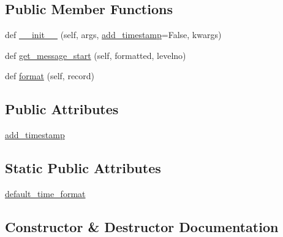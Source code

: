 \subsection*{Public Member Functions}
\begin{DoxyCompactItemize}
\item 
def \hyperlink{classpip_1_1__internal_1_1utils_1_1logging_1_1IndentingFormatter_a319d437a93091b5149193f7ed273616a}{\+\_\+\+\_\+init\+\_\+\+\_\+} (self, args, \hyperlink{classpip_1_1__internal_1_1utils_1_1logging_1_1IndentingFormatter_aed8747c14da43b94d392434bf73c4228}{add\+\_\+timestamp}=False, kwargs)
\item 
def \hyperlink{classpip_1_1__internal_1_1utils_1_1logging_1_1IndentingFormatter_afb5ccf6041a37cf3487c2b08bc31ef5f}{get\+\_\+message\+\_\+start} (self, formatted, levelno)
\item 
def \hyperlink{classpip_1_1__internal_1_1utils_1_1logging_1_1IndentingFormatter_a5d4332f67f315773e40b095d9873f690}{format} (self, record)
\end{DoxyCompactItemize}
\subsection*{Public Attributes}
\begin{DoxyCompactItemize}
\item 
\hyperlink{classpip_1_1__internal_1_1utils_1_1logging_1_1IndentingFormatter_aed8747c14da43b94d392434bf73c4228}{add\+\_\+timestamp}
\end{DoxyCompactItemize}
\subsection*{Static Public Attributes}
\begin{DoxyCompactItemize}
\item 
\hyperlink{classpip_1_1__internal_1_1utils_1_1logging_1_1IndentingFormatter_af319bffe5d951c33e88106869f2a9241}{default\+\_\+time\+\_\+format}
\end{DoxyCompactItemize}


\subsection{Constructor \& Destructor Documentation}
\mbox{\label{classpip_1_1__internal_1_1utils_1_1logging_1_1IndentingFormatter_a319d437a93091b5149193f7ed273616a}} 
